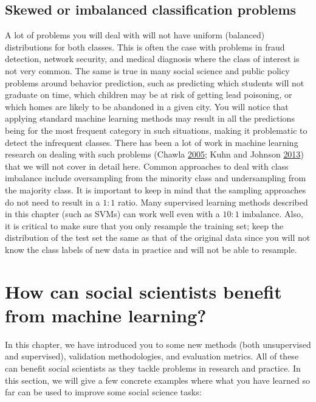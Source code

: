 \documentclass[]{krantz}
\begin{document}
\subsection{Skewed or imbalanced classification
problems}\label{skewed-or-imbalanced-classification-problems}

A lot of problems you will deal with will not have uniform (balanced)
distributions for both classes. This is often the case with problems in
fraud detection, network security, and medical diagnosis where the class
of interest is not very common. The same is true in many social science
and public policy problems around behavior prediction, such as
predicting which students will not graduate on time, which children may
be at risk of getting lead poisoning, or which homes are likely to be
abandoned in a given city. You will notice that applying standard
machine learning methods may result in all the predictions being for the
most frequent category in such situations, making it problematic to
detect the infrequent classes. There has been a lot of work in machine
learning research on dealing with such problems (Chawla
\protect\hyperlink{ref-Chawla05}{2005}; Kuhn and Johnson
\protect\hyperlink{ref-KuhnJohnson2013}{2013}) that we will not cover in
detail here. Common approaches to deal with class imbalance include
oversampling from the minority class and undersampling from the majority
class. It is important to keep in mind that the sampling approaches do
not need to result in a \(1:1\) ratio. Many supervised learning methods
described in this chapter (such as SVMs) can work well even with a
\(10:1\) imbalance. Also, it is critical to make sure that you only
resample the training set; keep the distribution of the test set the
same as that of the original data since you will not know the class
labels of new data in practice and will not be able to resample.

\section{How can social scientists benefit from machine
learning?}\label{how-can-social-scientists-benefit-from-machine-learning}

In this chapter, we have introduced you to some new methods (both
unsupervised and supervised), validation methodologies, and evaluation
metrics. All of these can benefit social scientists as they tackle
problems in research and practice. In this section, we will give a few
concrete examples where what you have learned so far can be used to
improve some social science tasks:
\end{document}
